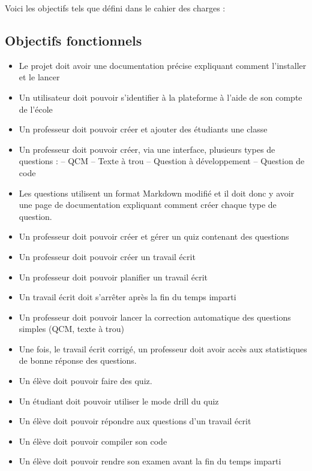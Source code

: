 \newpage

Voici les objectifs tels que défini dans le cahier des charges :
\subsection*{Objectifs fonctionnels}
\begin{itemize}
    \item Le projet doit avoir une documentation précise expliquant comment l'installer et le lancer
    \item Un utilisateur doit pouvoir s'identifier à la plateforme à l'aide de son compte de l'école
    \item Un professeur doit pouvoir créer et ajouter des étudiants une classe
    \item Un professeur doit pouvoir créer, via une interface, plusieurs types de questions :
          \subitem – QCM
          \subitem – Texte à trou
          \subitem – Question à développement
          \subitem – Question de code
    \item Les questions utilisent un format Markdown modifié et il doit donc y avoir une page de documentation expliquant comment créer chaque type de question.
    \item Un professeur doit pouvoir créer et gérer un quiz contenant des questions
    \item Un professeur doit pouvoir créer un travail écrit
    \item Un professeur doit pouvoir planifier un travail écrit
    \item Un travail écrit doit s'arrêter après la fin du temps imparti
    \item Un professeur doit pouvoir lancer la correction automatique des questions simples (QCM, texte à trou)
    \item Une fois, le travail écrit corrigé, un professeur doit avoir accès aux statistiques de bonne réponse des questions.
    \item Un élève doit pouvoir faire des quiz.
    \item Un étudiant doit pouvoir utiliser le mode drill du quiz
    \item Un élève doit pouvoir répondre aux questions d'un travail écrit
    \item Un élève doit pouvoir compiler son code
    \item Un élève doit pouvoir rendre son examen avant la fin du temps imparti
\end{itemize}

